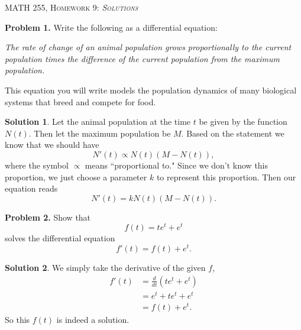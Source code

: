 \documentclass[12pt]{report} %
\theoremstyle{definition}
\newtheorem{solution}{Solution}
\begin{document}
\begin{center}
   \textsc{\large MATH 255, Homework 9: \emph{Solutions}}\\
\end{center}
\vspace{.5cm}

\noindent\textbf{Problem 1.} Write the following as a differential equation:

\emph{The rate of change of an animal population grows proportionally to the current population times the difference of the current population from the maximum population.}

This equation you will write models the population dynamics of many biological systems that breed and compete for food.
\begin{solution}
Let the animal population at the time $t$ be given by the function $N(t)$.  Then let the maximum population be $M$.  Based on the statement we know that we should have
\[
N'(t) \propto N(t)(M-N(t)),
\]
where the symbol $\propto$ means ``proportional to."  Since we don't know this proportion, we just choose a parameter $k$ to represent this proportion.  Then our equation reads
\[
N'(t) = k N(t) (M-N(t)).
\]
\end{solution}
\vspace*{.5cm}

\noindent\textbf{Problem 2.} Show that 
\[
f(t)=te^{t}+e^t
\]
solves the differential equation
\[
f'(t)=f(t)+e^t.
\]
\begin{solution}
We simply take the derivative of the given $f$, 
\begin{align*}
    f'(t)&= \frac{d}{dt} (te^t + e^t )\\
    &= e^t + te^t + e^t \\
    &= f(t) +e^t.
\end{align*}
So this $f(t)$ is indeed a solution.
\end{solution}
\vspace*{.5cm}
\end{document}
